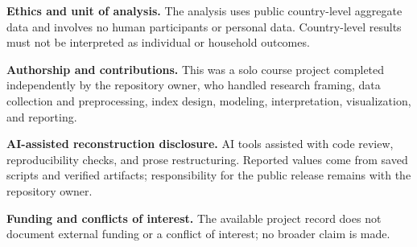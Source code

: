\documentclass[11pt]{article}
\begin{document}
\textbf{Ethics and unit of analysis.} The analysis uses public country-level aggregate data and involves no human participants or personal data. Country-level results must not be interpreted as individual or household outcomes.

\textbf{Authorship and contributions.} This was a solo course project completed independently by the repository owner, who handled research framing, data collection and preprocessing, index design, modeling, interpretation, visualization, and reporting.

\textbf{AI-assisted reconstruction disclosure.} AI tools assisted with code review, reproducibility checks, and prose restructuring. Reported values come from saved scripts and verified artifacts; responsibility for the public release remains with the repository owner.

\textbf{Funding and conflicts of interest.} The available project record does not document external funding or a conflict of interest; no broader claim is made.
\end{document}
